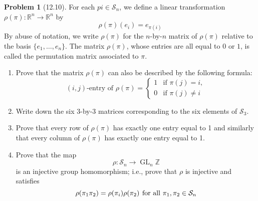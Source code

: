 \documentclass[12pt]{article}
\theoremstyle{definition}
\newtheorem{problem}{Problem}
\DeclareMathOperator{\GL}{GL}
\begin{document}
\begin{problem}[12.10]
    For each $pi \in \mathcal{S}_n$, we define a linear transformation $\rho(\pi): \mathbb{R}^n \longrightarrow \mathbb{R}^n$ by
    \[
        \rho(\pi)(e_i) = e_{\pi(i)}
    \]
    By abuse of notation, we write $\rho(\pi)$ for the $n$-by-$n$ matrix of $\rho(\pi)$ relative to the basis $\{e_1, \ldots, e_n\}$.
    The matrix $\rho(\pi)$, whose entries are all equal to $0$ or $1$, is called the permutation matrix associated to $\pi$.
    \begin{enumerate}[label=(\alph*)]
        \item Prove that the matrix $\rho(\pi)$ can also be described by the following formula:
        \[ 
            (i, j)\text{-entry of } \rho(\pi) = 
            \begin{cases} 
                1 & \text{if } \pi(j) = i,   \\
                0 & \text{if } \pi(j) \neq i
            \end{cases}
        \]
        \begin{solution}

        \end{solution}

        \item Write down the six 3-by-3 matrices corresponding to the six elements of $\mathcal{S}_3$.
        \begin{solution}

        \end{solution}

        \item Prove that every row of $\rho(\pi)$ has exactly one entry equal to 1 and similarly that every column of $\rho(\pi)$
              has exactly one entry equal to 1.
        \begin{solution}

        \end{solution}

        \item Prove that the map
        \[
            \rho : \mathcal{S}_n \longrightarrow \GL_n{\mathbb{Z}}
        \]
        is an injective group homomorphism; i.e., prove that $\rho$ is injective and satisfies
        \[
            \rho(\pi_1 \pi_2) = \rho(\pi_i)\rho(\pi_2) \hspace{4px} \text{for all } \pi_1, \pi_2 \in \mathcal{S}_n
        \]
        \begin{solution}

        \end{solution}


\end{enumerate}
\end{problem}
\end{document}
